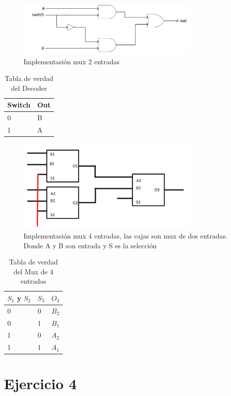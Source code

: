 \documentclass[../../../informe/src/main.tex]{subfiles}
\begin{document}
\begin{figure}[H]
\centering
\includegraphics[width=0.8\textwidth]{imagenes/mux2.png}
\caption{Implementasión mux 2 entradas} \label{fig=mux2}
\end{figure}

\begin{table}[h]
\begin{center}
\begin{tabular}{|l|l|}
\hline
Switch & Out\\
\hline \hline
0 & B  \\ \hline
1 & A  \\ \hline


\end{tabular}
\caption{Tabla de verdad del Decoder} 
\label{tab=decTab}
\end{center}
\end{table}

\begin{figure}[H]
\centering
\includegraphics[width=0.8\textwidth]{imagenes/mux4.png}
\caption{Implementasión mux 4 entradas, las cajas son mux de dos entradas. Donde A y B son entrada y S es la selección} \label{fig=mux4}
\end{figure}

\begin{table}[h]
\begin{center}
\begin{tabular}{|l|l|l|}
\hline
$S_{1}$ y $S_{2}$ & $S_{3}$  & $O_{3}$\\
\hline \hline
0 & 0 & $B_{2}$  \\ \hline
0 & 1 & $B_{1}$  \\ \hline
1 & 0 & $A_{2}$  \\ \hline
1 & 1 & $A_{1}$  \\ \hline

\end{tabular}
\caption{Tabla de verdad del Mux de 4 entradas} 
\label{tab=mux4tab}
\end{center}
\end{table}





\section{Ejercicio 4}
\end{document}
